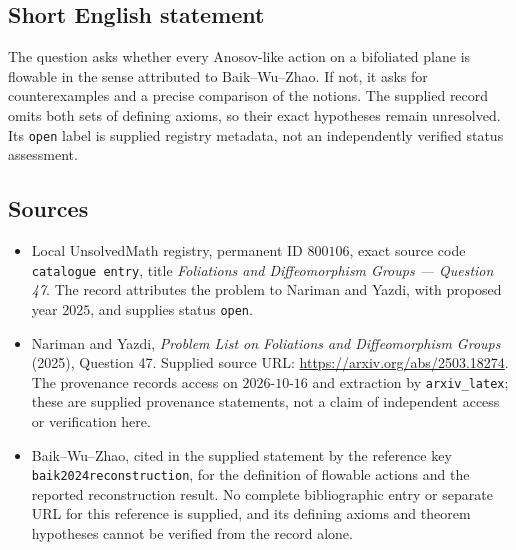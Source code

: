 \documentclass[11pt]{article}
\begin{document}
\subsection{Short English statement}
The question asks whether every Anosov-like action on a bifoliated plane is flowable in the sense attributed to Baik--Wu--Zhao. If not, it asks for counterexamples and a precise comparison of the notions. The supplied record omits both sets of defining axioms, so their exact hypotheses remain unresolved. Its \texttt{open} label is supplied registry metadata, not an independently verified status assessment.
\subsection{Sources}
\begin{itemize}
\item Local UnsolvedMath registry, permanent ID \(800106\), exact source code \texttt{catalogue entry}, title \emph{Foliations and Diffeomorphism Groups --- Question 47}. The record attributes the problem to Nariman and Yazdi, with proposed year \(2025\), and supplies status \texttt{open}.
\item Nariman and Yazdi, \emph{Problem List on Foliations and Diffeomorphism Groups} (2025), Question 47. Supplied source URL: \url{https://arxiv.org/abs/2503.18274}. The provenance records access on \(2026\text{-}10\text{-}16\) and extraction by \texttt{arxiv\_latex}; these are supplied provenance statements, not a claim of independent access or verification here.
\item Baik--Wu--Zhao, cited in the supplied statement by the reference key \texttt{baik2024reconstruction}, for the definition of flowable actions and the reported reconstruction result. No complete bibliographic entry or separate URL for this reference is supplied, and its defining axioms and theorem hypotheses cannot be verified from the record alone.
\end{itemize}
\end{document}
